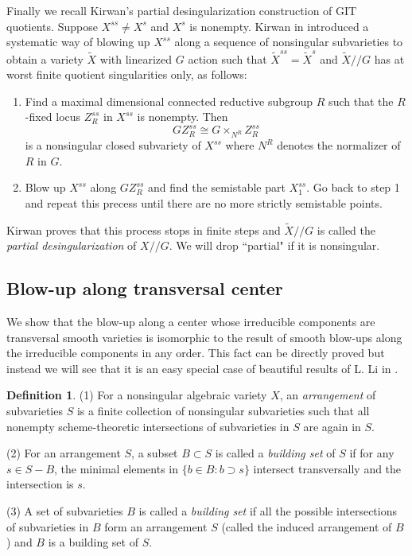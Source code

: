 \documentclass[10pt]{amsart}
\theoremstyle{definition}
\newtheorem{definition}[theorem]{Definition}
\def\git{/\!/ }
\begin{document}
Finally we recall Kirwan's partial desingularization construction
of GIT quotients. Suppose $X^{ss} \ne X^s$ and $X^s$ is nonempty.
Kirwan in \cite{Kirwan} introduced a systematic way of blowing up
$X^{ss}$ along a sequence of nonsingular subvarieties to obtain a
variety $\widetilde{X}$ with linearized $G$ action such that
$\widetilde{X}^{ss} = \widetilde{X}^s$ and $\widetilde{X}\git G$
has at worst finite quotient singularities only, as
follows:\begin{enumerate}
\item Find a maximal dimensional connected reductive subgroup $R$
such that the $R$-fixed locus $Z_R^{ss}$ in $X^{ss}$ is nonempty.
Then $$GZ_R^{ss}\cong G\times_{N^R}Z_R^{ss}$$ is a nonsingular
closed subvariety of $X^{ss}$ where $N^R$ denotes the normalizer
of $R$ in $G$.
\item Blow up $X^{ss}$ along $GZ_R^{ss}$ and find the semistable
part $X_1^{ss}$. Go back to step 1 and repeat this precess until
there are no more strictly semistable points.
\end{enumerate}
Kirwan proves that this process stops in finite steps and
$\widetilde{X}\git G$ is called the \emph{partial
desingularization} of $X \git G$. We will drop ``partial" if it is
nonsingular.




\subsection{Blow-up along transversal center}\label{sec2.3} We show that the
blow-up along a center whose irreducible components are
transversal smooth varieties is isomorphic to the result of smooth
blow-ups along the irreducible components in any order. This fact
can be directly proved but instead we will see that it is an easy
special case of beautiful results of L. Li in \cite{Li}.

\begin{definition} \cite[\S1]{Li}
(1) For a nonsingular algebraic variety $X$, an \emph{arrangement}
of subvarieties $S$ is a finite collection of nonsingular
subvarieties such that all nonempty scheme-theoretic intersections
of subvarieties in $S$ are again in $S$.

(2) For an arrangement $S$, a subset $B\subset S$ is called a
\emph{building set} of $S$ if for any $s \in S- B$, the minimal
elements in $\{b \in B : b \supset s\}$ intersect transversally
and the intersection is $s$.

(3) A set of subvarieties $B$ is called a \emph{building set} if
all the possible intersections of subvarieties in $B$ form an
arrangement $S$ (called the induced arrangement of $B$) and $B$ is
a building set of $S$.
\end{definition}
\end{document}

